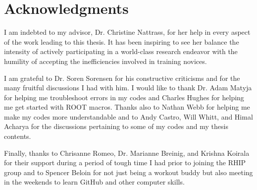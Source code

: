 \chapter*{Acknowledgments}\label{ch:acknowledgments}
I am indebted to my advisor, Dr. Christine Nattrass, for her help in every aspect of the work leading to this thesis. It has been inspiring to see her balance the intensity of actively participating in a world-class research endeavor with the humility of accepting the inefficiencies involved in training novices.

I am grateful to Dr. Soren Sorensen for his constructive criticisms and for the many fruitful discussions I had with him. I would like to thank Dr. Adam Matyja for helping me troubleshoot errors in my codes and Charles Hughes for helping me get started with ROOT macros. Thanks also to Nathan Webb for helping me make my codes more understandable and to Andy Castro, Will Whitt, and Himal Acharya for the discussions pertaining to some of my codes and my thesis contents.

Finally, thanks to Chrisanne Romeo, Dr. Marianne Breinig, and Krishna Koirala for their support during a period of tough time I had prior to joining the RHIP group and to Spencer Beloin for not just being a workout buddy but also meeting in the weekends to learn GitHub and other computer skills.
